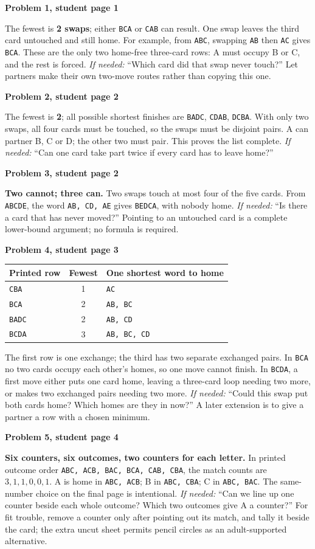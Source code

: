 \documentclass[11pt]{article}
\newcommand{\sub}[1]{\par\textbf{#1}\par}
\newcommand{\row}[1]{\texttt{#1}}
\newcommand{\hint}[1]{\emph{If needed:} #1}
\begin{document}
\sub{Problem 1, student page 1}
The fewest is \textbf{2 swaps}; either \row{BCA} or \row{CAB} can result. One swap leaves the third card untouched and still home. For example, from \row{ABC}, swapping \row{AB} then \row{AC} gives \row{BCA}. These are the only two home-free three-card rows: A must occupy B or C, and the rest is forced. \hint{``Which card did that swap never touch?''} Let partners make their own two-move routes rather than copying this one.

\sub{Problem 2, student page 2}
The fewest is \textbf{2}; all possible shortest finishes are \row{BADC}, \row{CDAB}, \row{DCBA}. With only two swaps, all four cards must be touched, so the swaps must be disjoint pairs. A can partner B, C or D; the other two must pair. This proves the list complete. \hint{``Can one card take part twice if every card has to leave home?''}

\sub{Problem 3, student page 2}
\textbf{Two cannot; three can.} Two swaps touch at most four of the five cards. From \row{ABCDE}, the word \row{AB, CD, AE} gives \row{BEDCA}, with nobody home. \hint{``Is there a card that has never moved?''} Pointing to an untouched card is a complete lower-bound argument; no formula is required.

\sub{Problem 4, student page 3}
\begin{center}\renewcommand{\arraystretch}{1.15}
\begin{tabular}{lcl}
Printed row & Fewest & One shortest word to home\\\midrule
\row{CBA} & 1 & \row{AC}\\
\row{BCA} & 2 & \row{AB, BC}\\
\row{BADC} & 2 & \row{AB, CD}\\
\row{BCDA} & 3 & \row{AB, BC, CD}
\end{tabular}
\end{center}
The first row is one exchange; the third has two separate exchanged pairs. In \row{BCA} no two cards occupy each other's homes, so one move cannot finish. In \row{BCDA}, a first move either puts one card home, leaving a three-card loop needing two more, or makes two exchanged pairs needing two more. \hint{``Could this swap put both cards home? Which homes are they in now?''} A later extension is to give a partner a row with a chosen minimum.

\sub{Problem 5, student page 4}
\textbf{Six counters, six outcomes, two counters for each letter.} In printed outcome order \row{ABC, ACB, BAC, BCA, CAB, CBA}, the match counts are $3,1,1,0,0,1$. A is home in \row{ABC, ACB}; B in \row{ABC, CBA}; C in \row{ABC, BAC}. The same-number choice on the final page is intentional. \hint{``Can we line up one counter beside each whole outcome? Which two outcomes give A a counter?''} For fit trouble, remove a counter only after pointing out its match, and tally it beside the card; the extra uncut sheet permits pencil circles as an adult-supported alternative.
\end{document}

